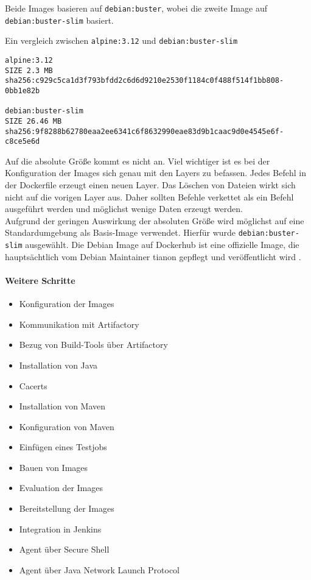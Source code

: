 Beide Images basieren auf \lstinline{debian:buster}, wobei die zweite Image auf \lstinline{debian:buster-slim} basiert.

Ein vergleich zwischen \lstinline{alpine:3.12} und \lstinline{debian:buster-slim}
\begin{verbatim}
alpine:3.12
SIZE 2.3 MB
sha256:c929c5ca1d3f793bfdd2c6d6d9210e2530f1184c0f488f514f1bb808-
0bb1e82b

debian:buster-slim
SIZE 26.46 MB
sha256:9f8288b62780eaa2ee6341c6f8632990eae83d9b1caac9d0e4545e6f-
c8ce5e6d
\end{verbatim}

Auf die absolute Größe kommt es nicht an. Viel wichtiger ist es bei der Konfiguration der Images sich genau mit den Layers zu befassen. Jedes Befehl in der Dockerfile erzeugt einen neuen Layer. Das Löschen von Dateien wirkt sich nicht auf die vorigen Layer aus. Daher sollten Befehle verkettet als ein Befehl ausgeführt werden und möglichst wenige Daten erzeugt werden. 
\medskip
\\
Aufgrund der geringen Auswirkung der absoluten Größe wird möglichst auf eine Standardumgebung als Basis-Image verwendet. Hierfür wurde \lstinline{debian:buster-slim} ausgewählt. Die Debian Image auf Dockerhub ist eine offizielle Image, die hauptsächtlich vom Debian Maintainer tianon gepflegt und veröffentlicht wird \cite{docker-debian-builds, docker-debian}.

\paragraph{Weitere Schritte}
\begin{itemize}
    \item Konfiguration der Images
    \item Kommunikation mit Artifactory
    \item Bezug von Build-Tools über Artifactory
    \item Installation von Java
    \item Cacerts
    \item Installation von Maven
    \item Konfiguration von Maven
    \item Einfügen eines Testjobs
    \item Bauen von Images
    \item Evaluation der Images
    \item Bereitstellung der Images
    \item Integration in Jenkins
    \item Agent über Secure Shell
    \item Agent über Java Network Launch Protocol
\end{itemize}